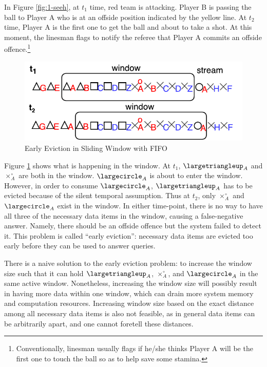 In Figure \ref{fig:1-seeh},
at $t_{1}$ time, red team is attacking.
Player B is passing the ball to Player A who is at an offside position indicated by the yellow line. 
At $t_{2}$ time, Player A is the first one to get the ball and about to take a shot.
At this moment, the linesman flags to notify the referee that Player A commits an offside offence.\footnote{Conventionally, linesman usually flags if he/she thinks Player A will be the first one to touch the ball so as to help save some stamina.}

\begin{figure}[!htbp]
	\centering
	\includegraphics[width=5in]{img/1-seew.pdf}
	\caption{Early Eviction in Sliding Window with FIFO}
	\label{fig:1-seew} 
\end{figure}

Figure \ref{fig:1-seew} shows what is happening in the window. 
At $t_{1}$, $\largetriangleup_{A}$ and $\times^{\circ}_{A}$ are both in the window. 
$\largecircle_{A}$ is about to enter the window. 
However, in order to consume $\largecircle_{A}$, $\largetriangleup_{A}$ has to be evicted because of the silent temporal assumption. 
Thus at $t_{2}$, only $\times^{\circ}_{A}$ and $\largecircle_{A}$ exist in the window. 
In either time-point, there is no way to have all three of the necessary data items in the window, causing a false-negative answer. 
Namely, there should be an offside offence but the system failed to detect it. 
This problem is called ``early eviction'': necessary data items are evicted too early before they can be used to answer queries. 

There is a naive solution to the early eviction problem: 
to increase the window size such that it can hold $\largetriangleup_{A}$, $\times^{\circ}_{A}$, and $\largecircle_{A}$ in the same active window.
Nonetheless, increasing the window size will possibly result in having more data within one window, which can drain more system memory and computation resources. 
Increasing window size based on the exact distance among all necessary data items is also not feasible, as in general data items can be arbitrarily apart, and one cannot foretell these distances.
%

